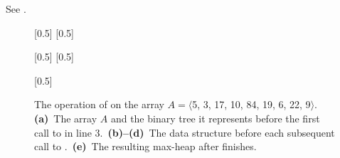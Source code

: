 See .
\begin{figure}[htb]
    \captionsetup[subfigure]{}
    \subcaptionbox{\label{fig:6.3-1a}}[0.5\textwidth]{}
    \subcaptionbox{\label{fig:6.3-1b}}[0.5\textwidth]{}
    \par\vspace{7mm}
    \subcaptionbox{\label{fig:6.3-1c}}[0.5\textwidth]{}
    \subcaptionbox{\label{fig:6.3-1d}}[0.5\textwidth]{}
    \par\vspace{7mm}
    \subcaptionbox{\label{fig:6.3-1e}}[0.5\textwidth]{}
    \caption{The operation of  on the array $A=\langle$5, 3, 17, 10, 84, 19, 6, 22, 9$\rangle$.\,
    \textbf{(a)}\, The array $A$ and the binary tree it represents before the first call to  in line 3.\,
    \textbf{(b)--(d)}\, The data structure before each subsequent call to .\,
    \textbf{(e)}\, The resulting max-heap after  finishes.} \label{fig:6.3-1}
\end{figure}
